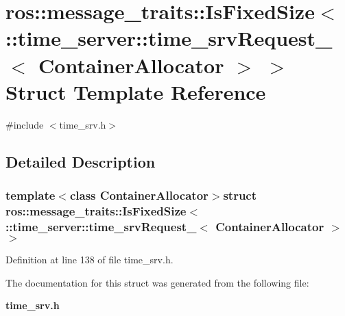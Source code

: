 \section{ros\-:\-:message\-\_\-traits\-:\-:\-Is\-Fixed\-Size$<$ \-:\-:time\-\_\-server\-:\-:time\-\_\-srv\-Request\-\_\-$<$ \-Container\-Allocator $>$ $>$ \-Struct \-Template \-Reference}
\label{structros_1_1message__traits_1_1IsFixedSize_3_01_1_1time__server_1_1time__srvRequest___3_01ContainerAllocator_01_4_01_4}


{\ttfamily \#include $<$time\-\_\-srv.\-h$>$}



\subsection{\-Detailed \-Description}
\subsubsection*{template$<$class Container\-Allocator$>$struct ros\-::message\-\_\-traits\-::\-Is\-Fixed\-Size$<$ \-::time\-\_\-server\-::time\-\_\-srv\-Request\-\_\-$<$ Container\-Allocator $>$ $>$}



\-Definition at line 138 of file time\-\_\-srv.\-h.



\-The documentation for this struct was generated from the following file\-:\begin{DoxyCompactItemize}
\item 
{\bf time\-\_\-srv.\-h}\end{DoxyCompactItemize}
